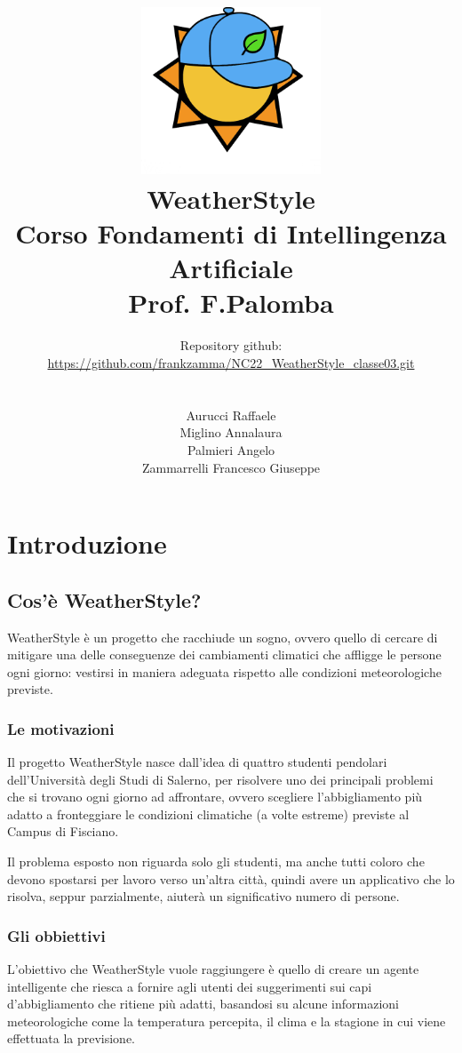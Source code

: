 \documentclass[a4paper, 11pt, oneside]{report}
\title{\includegraphics[width=0.4\textwidth]{logo}\\WeatherStyle\\Corso Fondamenti di Intellingenza Artificiale\\Prof. F.Palomba}
\author{Repository github:\\\url{https://github.com/frankzamma/NC22_WeatherStyle_classe03.git}\\\\
        \\Aurucci Raffaele\\Miglino Annalaura\\Palmieri Angelo\\Zammarrelli Francesco Giuseppe}
\date{}
\begin{document}
    \begin{titlepage}
        \maketitle
    \end{titlepage}

    \tableofcontents

    \part{Introduzione}
        \chapter{Cos'è WeatherStyle?}
            WeatherStyle è un progetto che racchiude un sogno, ovvero quello di cercare di mitigare una delle conseguenze
            dei cambiamenti climatici che affligge le persone ogni giorno: vestirsi in maniera adeguata rispetto alle condizioni
            meteorologiche previste.

            \section{Le motivazioni}
            Il progetto WeatherStyle nasce dall'idea di quattro studenti pendolari dell'Università degli Studi di Salerno, per
            risolvere uno dei principali problemi che si trovano ogni giorno ad affrontare, ovvero scegliere l'abbigliamento
            più adatto a fronteggiare le condizioni climatiche (a volte estreme) previste al Campus di Fisciano.
            \par \noindent Il problema esposto non riguarda solo gli studenti, ma anche tutti coloro che devono spostarsi per lavoro
            verso un'altra città, quindi avere un applicativo che lo risolva, seppur parzialmente,
            aiuterà un significativo numero di persone.

            \section{Gli obbiettivi}
            L'obiettivo che WeatherStyle vuole raggiungere è quello di creare un agente intelligente che riesca a fornire
            agli utenti dei suggerimenti sui capi d'abbigliamento che ritiene più adatti, basandosi su alcune informazioni
            meteorologiche come la temperatura percepita, il clima e la stagione in cui viene effettuata la previsione.
\end{document}
